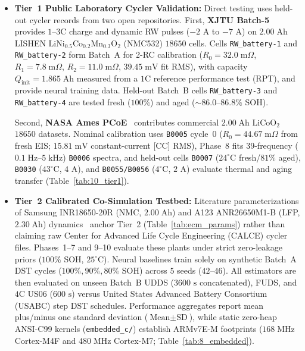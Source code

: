 \documentclass[10pt,a4paper]{article}
\begin{document}
\begin{itemize}
\item \textbf{Tier~1 Public Laboratory Cycler Validation:} Direct testing uses held-out cycler records from two open repositories. First, \textbf{XJTU Batch-5}~\cite{Wang2024xjtu} provides $1\text{--}3\text{C}$ charge and dynamic RW pulses ($-2\text{ A}$ to $-7\text{ A}$) on $2.00\;\mathrm{Ah}$ LISHEN $\text{LiNi}_{0.5}\text{Co}_{0.2}\text{Mn}_{0.3}\text{O}_2$ (NMC532) $18650$ cells. Cells \texttt{RW\_battery-1} and \texttt{RW\_battery-2} form Batch~A for 2-RC calibration ($R_0 = 32.0\;\mathrm{m}\Omega$, $R_1 = 7.8\;\mathrm{m}\Omega$, $R_2 = 11.0\;\mathrm{m}\Omega$, $39.45\;\mathrm{mV}$ fit RMS), with capacity $Q_{\text{init}} = 1.865\;\mathrm{Ah}$ measured from a $1\text{C}$ reference performance test (RPT), and provide neural training data. Held-out Batch~B cells \texttt{RW\_battery-3} and \texttt{RW\_battery-4} are tested fresh ($100\%$) and aged ($\sim 86.0\text{--}86.8\%$ SOH).

Second, \textbf{NASA Ames PCoE}~\cite{Saha2007nasa} contributes commercial $2.00\;\mathrm{Ah}$ $\text{LiCoO}_2$ $18650$ datasets. Nominal calibration uses \texttt{B0005} cycle~0 ($R_0 = 44.67\;\mathrm{m}\Omega$ from fresh EIS; $15.81\;\mathrm{mV}$ constant-current [CC] RMS), Phase~8 fits $39$-frequency ($0.1\;\mathrm{Hz}\text{--}5\;\mathrm{kHz}$) \texttt{B0006} spectra, and held-out cells \texttt{B0007} ($24^\circ\text{C}$ fresh/$81\%$ aged), \texttt{B0030} ($43^\circ\text{C}$, $4\text{ A}$), and \texttt{B0055/B0056} ($4^\circ\text{C}$, $2\text{ A}$) evaluate thermal and aging transfer (Table~\ref{tab:10_tier1}).
\item \textbf{Tier~2 Calibrated Co-Simulation Testbed:} Literature parameterizations of Samsung INR18650-20R (NMC, $2.00\;\mathrm{Ah}$) and A123 ANR26650M1-B (LFP, $2.30\;\mathrm{Ah}$) dynamics~\cite{He2011ecm,Hu2012ecm,Birkl2017diagnostics,Pecht2011calce} anchor Tier~2 (Table~\ref{tab:ecm_params}) rather than claiming raw Center for Advanced Life Cycle Engineering (CALCE) cycler files. Phases~1--7 and 9--10 evaluate these plants under strict zero-leakage priors ($100\%$ SOH, $25^\circ\text{C}$). Neural baselines train solely on synthetic Batch~A DST cycles ($100\%, 90\%, 80\%$ SOH) across $5$ seeds ($42\text{--}46$). All estimators are then evaluated on unseen Batch~B UDDS ($3600\text{ s}$ concatenated), FUDS, and $4\text{C}$ US06 ($600\text{ s}$) versus United States Advanced Battery Consortium (USABC) step DST schedules. Performance aggregates report mean plus/minus one standard deviation ($\text{Mean}\pm\text{SD}$), while static zero-heap ANSI-C99 kernels (\texttt{embedded\_c/}) establish ARMv7E-M footprints ($168\;\mathrm{MHz}$ Cortex-M4F and $480\;\mathrm{MHz}$ Cortex-M7; Table~\ref{tab:8_embedded}).
\end{itemize}
\end{document}
